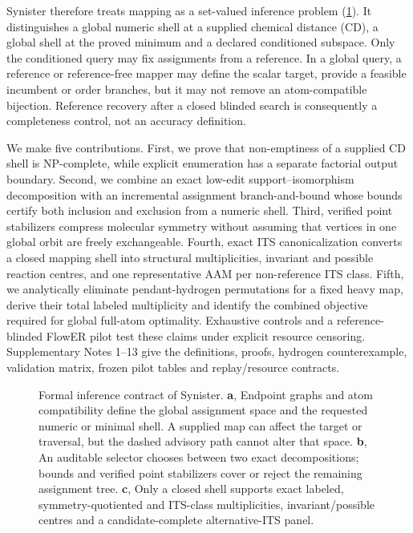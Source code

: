 \documentclass[11pt]{article}
\begin{document}
Synister therefore treats mapping as a set-valued inference problem
(\cref{fig:workflow}).  It distinguishes a global numeric shell at a supplied
chemical distance (CD), a global shell at the proved minimum and a declared
conditioned subspace.  Only the conditioned query may fix assignments from a
reference.  In a global query, a reference or reference-free mapper may define
the scalar target, provide a feasible incumbent or order branches, but it may
not remove an atom-compatible bijection.  Reference recovery after a closed
blinded search is consequently a completeness control, not an accuracy
definition.

We make five contributions.  First, we prove that non-emptiness of a supplied
CD shell is NP-complete, while explicit enumeration has a separate factorial
output boundary.  Second, we combine an exact low-edit
support--isomorphism decomposition with an incremental assignment
branch-and-bound whose bounds certify both inclusion and exclusion from a
numeric shell.  Third, verified point stabilizers compress molecular symmetry
without assuming that vertices in one global orbit are freely exchangeable.
Fourth, exact ITS canonicalization converts a closed mapping shell into
structural multiplicities, invariant and possible reaction centres, and one
representative AAM per non-reference ITS class.  Fifth, we analytically
eliminate pendant-hydrogen permutations for a fixed heavy map, derive their
total labeled multiplicity and identify the combined objective required for
global full-atom optimality.  Exhaustive controls and a
reference-blinded FlowER pilot test these claims under explicit resource
censoring.  Supplementary Notes 1--13 give the definitions, proofs, hydrogen
counterexample, validation matrix, frozen pilot tables and replay/resource
contracts.

\begin{figure}[t]
\centering
\resizebox{\linewidth}{!}{}
\caption{Formal inference contract of Synister.  \textbf{a}, Endpoint graphs
and atom compatibility define the global assignment space and the requested
numeric or minimal shell.  A supplied map can affect the target or traversal,
but the dashed advisory path cannot alter that space.  \textbf{b}, An
auditable selector chooses between two exact decompositions; bounds and
verified point stabilizers cover or reject the remaining assignment tree.
\textbf{c}, Only a closed shell supports exact labeled, symmetry-quotiented
and ITS-class multiplicities, invariant/possible centres and a
candidate-complete alternative-ITS panel.}
\label{fig:workflow}
\end{figure}
\end{document}
